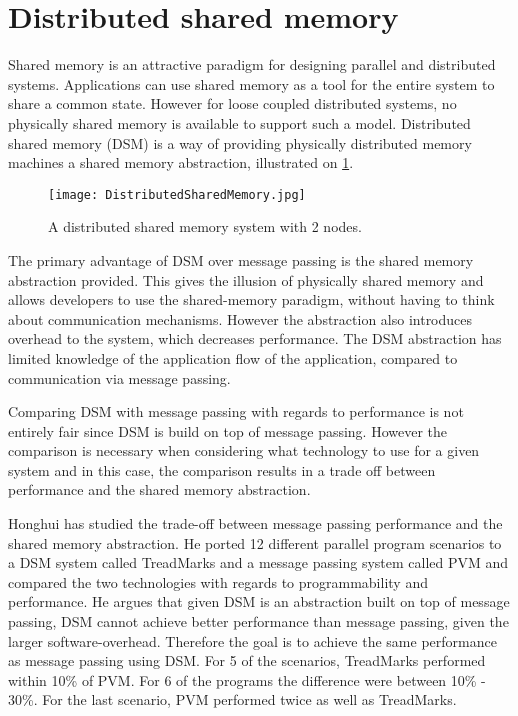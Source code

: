 \section{Distributed shared memory}

Shared memory is an attractive paradigm for designing parallel and distributed systems. Applications can use shared memory as a tool for the entire system to share a common state. However for loose coupled distributed systems, no physically shared memory is available to support such a model. Distributed shared memory (DSM) is a way of providing physically distributed memory machines a shared memory abstraction, illustrated on \cref{fig:distributedSharedMemory}.

\begin{figure}
	\centering
	\texttt{[image: DistributedSharedMemory.jpg]} 
	\caption[Distributed Computing System with 2 nodes]{
		\label{fig:distributedSharedMemory} 
		\footnotesize{%
			A distributed shared memory system with 2 nodes.
		}
	}
\end{figure}

The primary advantage of DSM over message passing is the shared memory abstraction provided. This gives the illusion of physically shared memory and allows developers to use the shared-memory paradigm, without having to think about communication mechanisms. However the abstraction also introduces overhead to the system, which decreases performance. The DSM abstraction has limited knowledge of the application flow of the application, compared to communication via message passing. 
 
Comparing DSM with message passing with regards to performance is not entirely fair since DSM is build on top of message passing. However the comparison is necessary when considering what technology to use for a given system and in this case, the comparison results in a trade off between performance and the shared memory abstraction. 

Honghui \cite{lu1995message} has studied the trade-off between message passing performance and the shared memory abstraction. He ported 12 different parallel program scenarios to a DSM system called TreadMarks and a message passing system called PVM and compared the two technologies with regards to programmability and performance. He argues that given DSM is an abstraction built on top of message passing, DSM cannot achieve better performance than message passing, given the larger software-overhead. Therefore the goal is to achieve the same performance as message passing using DSM. For 5 of the scenarios, TreadMarks performed within 10\% of PVM. For 6 of the programs the difference were between 10\% - 30\%. For the last scenario, PVM performed twice as well as TreadMarks. 

